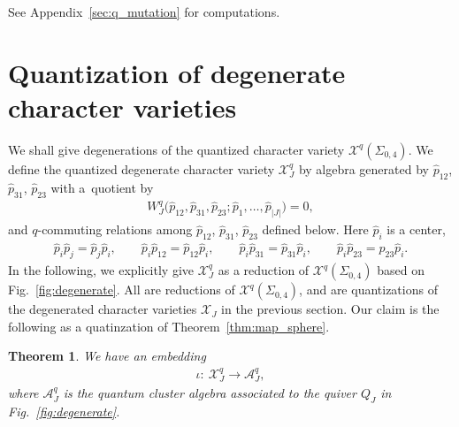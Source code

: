 \documentclass[10pt,a4paper]{amsart}
\numberwithin{equation}{section}
\newtheorem{Theorem}{Theorem}[section]
\begin{document}
See Appendix~\ref{sec:q_mutation} for computations.

\section{Quantization of degenerate character varieties}\label{sec:q_confluence}
We shall give degenerations of the quantized character variety $\mathcal{X}^q(\Sigma_{0,4})$. We define the quantized degenerate character variety $\mathcal{X}^q_J$ by algebra generated by $\hat{p}_{12}$, $\hat{p}_{31}$, $\hat{p}_{23}$ with a~quotient by
\begin{gather*} %
 W^q_J\big(\hat{p}_{12},\hat{p}_{31},\hat{p}_{23}; \hat{p}_1, \dots, \hat{p}_{|J|} \big) =0 ,
\end{gather*}
and $q$-commuting relations among $\hat{p}_{12}$, $\hat{p}_{31}$, $\hat{p}_{23}$ defined below. Here $\hat{p}_i$ is a center,
\begin{gather*} %
 \hat{p}_i \hat{p}_j = \hat{p}_j \hat{p}_i, \qquad \hat{p}_i \hat{p}_{12} = \hat{p}_{12} \hat{p}_{i} , \qquad \hat{p}_i \hat{p}_{31} = \hat{p}_{31} \hat{p}_{i} , \qquad \hat{p}_i \hat{p}_{23} = \hat{p}_{23} \hat{p}_{i} .
\end{gather*}
In the following, we explicitly give $\mathcal{X}^q_J$ as a reduction of $\mathcal{X}^q(\Sigma_{0,4})$ based on Fig.~\ref{fig:degenerate}. All are reductions of $\mathcal{X}^q(\Sigma_{0,4})$, and are quantizations of the degenerated character varieties $\mathcal{X}_J$ in the previous section. Our claim is the following as a quatinzation of Theorem~\ref{thm:map_sphere}.

\begin{Theorem} \label{thm:q_sphere} We have an embedding
 \begin{gather*}
 \iota\colon \ \mathcal{X}^q_J \to \mathcal{A}^q_J,
 \end{gather*}
 where $\mathcal{A}^q_J$ is the quantum cluster algebra associated to the quiver ${Q}_J$ in Fig.~{\rm \ref{fig:degenerate}}.
\end{Theorem}
\end{document}
